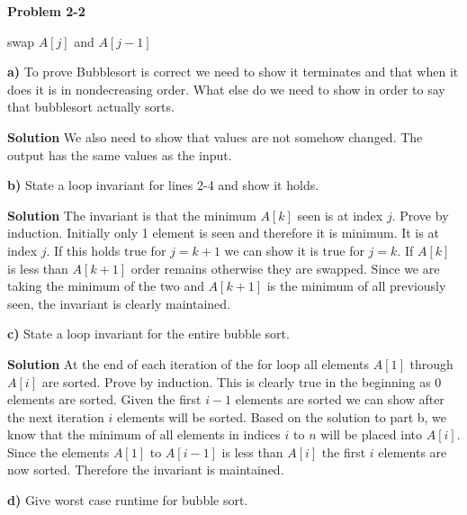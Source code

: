\documentclass{article}
\begin{document}
\textbf{Problem 2-2}
\begin{algorithm}
\begin{algorithmic}[1]
			\State swap $A[j]$ and $A[j-1]$
		\EndIf
	\EndFor
\EndFor
\EndProcedure
\end{algorithmic}
\end{algorithm}

\textbf{a)} To prove Bubblesort is correct we need to show it terminates and that when it does it is in nondecreasing order. What else do we need to show in order to say that bubblesort actually sorts.

\medskip

\textbf{Solution} We also need to show that values are not somehow changed. The output has the same values as the input.

\medskip

\textbf{b)} State a loop invariant for lines 2-4 and show it holds.

\medskip

\textbf{Solution} The invariant is that the minimum $A[k]$ seen is at index $j$. Prove by induction. Initially only 1 element is seen and therefore it is minimum. It is at index $j$. If this holds true for $j = k+1$ we can show it is true for $j = k$. If $A[k]$ is less than $A[k+1]$ order remains otherwise they are swapped. Since we are taking the minimum of the two and $A[k+1]$ is the minimum of all previously seen, the invariant is clearly maintained.

\medskip

\textbf{c)} State a loop invariant for the entire bubble sort.

\medskip

\textbf{Solution} At the end of each iteration of the for loop all elements $A[1]$ through $A[i]$ are sorted. Prove by induction. This is clearly true in the beginning as 0 elements are sorted. Given the first $i-1$ elements are sorted we can show after the next iteration $i$ elements will be sorted. Based on the solution to part b, we know that the minimum of all elements in indices $i$ to $n$ will be placed into $A[i]$. Since the elements $A[1]$ to $A[i-1]$ is less than $A[i]$ the first $i$ elements are now sorted. Therefore the invariant is maintained.

\medskip

\textbf{d)} Give worst case runtime for bubble sort.
\end{document}

